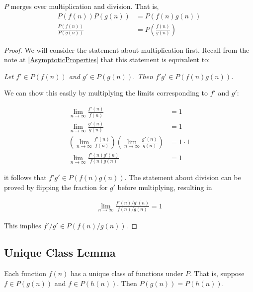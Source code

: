 \begin{theorem}
	$P$ merges over multiplication and division. That is,
	\begin{align*}
	P(f(n))P(g(n)) &= P(f(n)g(n))\\
	\frac {P(f(n))} {P(g(n))} &= P\left(\frac{f(n)} {g(n)}\right)
	\end{align*}
\end{theorem}

\begin{proof}
	We will consider the statement about multiplication first. Recall from the note at \ref{AsymptoticProperties} that this statement is equivalent to:
	
	\textit{Let $f' \in P(f(n))$ and $g' \in P(g(n))$. Then $f'g' \in P(f(n)g(n))$.}
	
	We can show this easily by multiplying the limits corresponding to $f'$ and $g'$:
	
	\begin{align*}
	\lim_{n \to \infty} \frac{f'(n)}{f(n)} &= 1\\
	\lim_{n \to \infty} \frac{g'(n)}{g(n)} &= 1\\
	\left( \lim_{n \to \infty} \frac{f'(n)}{f(n)} \right) \left( \lim_{n \to \infty} \frac{g'(n)}{g(n)} \right) &= 1 \cdot 1\\
	\lim_{n \to \infty} \frac{f'(n)g'(n)}{f(n)g(n)} &= 1
	\end{align*}
	
	it follows that $f'g' \in P(f(n)g(n))$. The statement about division can be proved by flipping the fraction for $g'$ before multiplying, resulting in
	
	\begin{align*}
	\lim_{n \to \infty} \frac{f'(n) / g'(n)}{f(n) / g(n)} = 1
	\end{align*}
	
	This implies $f' / g' \in P(f(n) / g(n))$.
\end{proof}

\subsection{Unique Class Lemma}
\label{UniqueClassOfFunctions}

\begin{lemma}
	Each function $f(n)$ has a unique class of functions under $P$. That is, suppose $f \in P(g(n))$ and $f \in P(h(n))$. Then $P(g(n)) = P(h(n))$.
\end{lemma}

